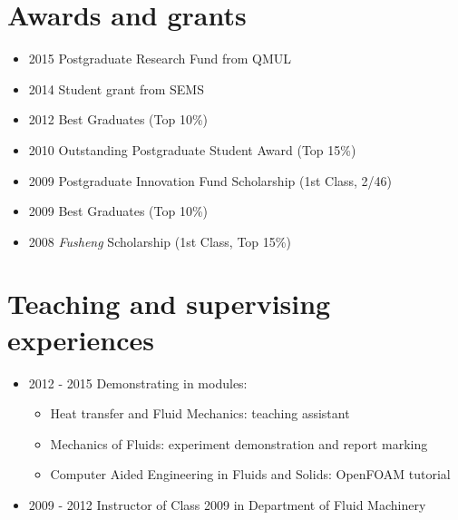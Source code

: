 \documentclass[letterpaper]{article}
\begin{document}
\vspace{-12pt}
\section*{Awards and grants}
\vspace{-10pt}
\begin{itemize}
\item 2015 Postgraduate Research Fund from QMUL
\item 2014 Student grant from SEMS
\item 2012 Best Graduates (Top 10\%)
\item 2010 Outstanding Postgraduate Student Award (Top 15\%)
\item 2009 Postgraduate Innovation Fund Scholarship (1st Class, 2/46)
\item 2009 Best Graduates (Top 10\%)
\item 2008 \textit{Fusheng} Scholarship (1st Class, Top 15\%)
\end{itemize}

\vspace{-12pt}
\section*{Teaching and supervising experiences}
\vspace{-10pt}

\begin{itemize}
\item	2012 - 2015  \hspace{2pt} Demonstrating in modules:
		\begin{itemize}
		\item	Heat transfer and Fluid Mechanics: teaching assistant
		\item	Mechanics of Fluids: experiment demonstration and report marking
		\item	Computer Aided Engineering in Fluids and Solids: OpenFOAM tutorial
		\end{itemize}

\item	2009 - 2012  \hspace{2pt} Instructor of Class 2009 in Department of Fluid Machinery
\end{itemize}

\end{document}
